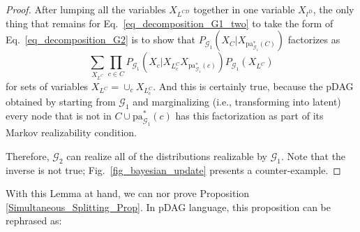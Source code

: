 \begin{proof}
After lumping all the variables $X_{L^{CD}}$ together in one variable $X_{l^D}$, the only thing that remains for Eq.~\eqref{eq_decomposition_G1_two} to take the form of Eq.~\eqref{eq_decomposition_G2} is to show that $P_{\mathcal{G}_1}(X_C|X_{\text{pa}^*_{\mathcal{G}_1}(C)})$ factorizes as 
\begin{equation}
	\sum_{X_{L^{C}}}\prod_{c\in C} P_{\mathcal{G}_1}(X_c|X_{L^{C}_c}X_{\text{pa}^*_{\mathcal{G}_1}(c)})P_{\mathcal{G}_1}(X_{L^{C}})
\end{equation}
for sets of variables $X_{L^C} =\cup_c X_{L^{C}_c}$. And this is certainly true, because the pDAG obtained by starting from $\mathcal{G}_1$ and marginalizing (i.e., transforming into latent) every node that is not in $C\cup\text{pa}^*_{\mathcal{G}_1}(c)$ has this factorization as part of its Markov realizability condition.

Therefore, $\mathcal{G}_2$ can realize all of the distributions realizable by $\mathcal{G}_1$. Note that the inverse is not true; Fig.~\ref{fig_bayesian_update} presents a counter-example.

    
\end{proof}

With this Lemma at hand, we can nor prove Proposition \ref{Simultaneous_Splitting_Prop}. In pDAG language, this proposition can be rephrased as:

